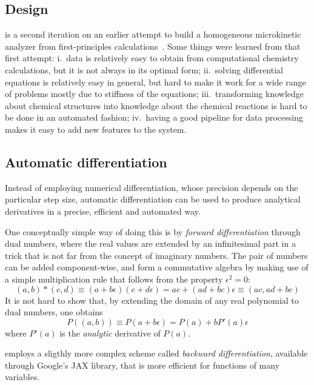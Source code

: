 \subsection{Design}

\overreact{} is a second iteration on an earlier attempt to build a
homogeneous microkinetic analyzer from first-principles
calculations~\cite{pyrrole2019zenodo}.
Some things were learned from that first attempt:
i.\ data is relatively easy to obtain from computational chemistry calculations,
but it is not always in its optimal form;
ii.\ solving differential equations is relatively easy in general, but hard to
make it work for a wide range of problems mostly due to stiffness of the
equations;
iii.\ transforming knowledge about chemical structures into knowledge about the
chemical reactions is hard to be done in an automated fashion;
iv.\ having a good pipeline for data processing makes it easy to add new
features to the system.

\subsection{Automatic differentiation}

Instead of employing numerical differentiation, whose precision depends on the
particular step size, automatic differentiation can be used to produce
analytical derivatives in a precise, efficient and automated way.

One conceptually simple way of doing this is by \emph{forward differentiation}
through dual numbers, where the real values are extended by an infinitesimal
part in a trick that is not far from the concept of imaginary numbers.
The pair of numbers can be added component-wise, and form a commutative algebra
by making use of a simple multiplication rule that follows from the property
$\epsilon^2 = 0$:
\begin{equation}
	(a, b) * (c, d)
	\equiv (a + b\epsilon)(c + d\epsilon)
	= a c + (a d + b c)\epsilon
	\equiv (a c, a d + b c)
\end{equation}
It is not hard to show that, by extending the domain of any real polynomial to
dual numbers, one obtains
\begin{equation}
	P((a, b)) \equiv P(a + b\epsilon) = P(a) + b P'(a) \epsilon
\end{equation}
where $P'(a)$ is the \emph{analytic} derivative of $P(a)$.

\overreact{} employs a sligthly more complex scheme called
\emph{backward differentiation}, available through Google's JAX library, that
is more efficient for functions of many variables.
